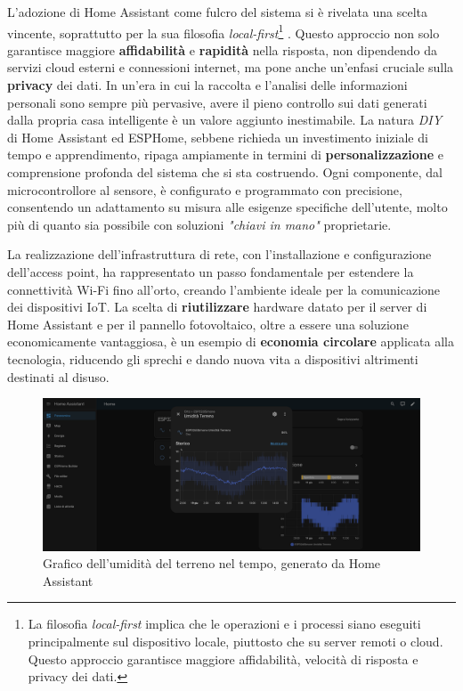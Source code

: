 \documentclass[11pt, a4paper]{article}
\begin{document}
L'adozione di Home Assistant come fulcro del sistema si è rivelata una scelta vincente, 
soprattutto per la sua filosofia 
\textit{local-first}\footnote{La filosofia \textit{local-first} implica che le operazioni e i processi
siano eseguiti principalmente sul dispositivo locale, piuttosto che su server remoti
o cloud. Questo approccio garantisce maggiore affidabilità, velocità di risposta e privacy dei dati.}
. Questo approccio non solo garantisce maggiore 
\textbf{affidabilità} e \textbf{rapidità} nella risposta, non dipendendo da servizi cloud esterni e connessioni 
internet, ma pone anche un'enfasi cruciale sulla \textbf{privacy} dei dati. In un'era in cui la raccolta 
e l'analisi delle informazioni personali sono sempre più pervasive, avere il pieno controllo sui 
dati generati dalla propria casa intelligente è un valore aggiunto inestimabile. La natura \textit{DIY} 
di Home Assistant ed ESPHome, sebbene richieda un investimento iniziale di 
tempo e apprendimento, ripaga ampiamente in termini di \textbf{personalizzazione} e comprensione profonda 
del sistema che si sta costruendo. Ogni componente, dal microcontrollore al sensore, è 
configurato e programmato con precisione, consentendo un adattamento su misura alle esigenze 
specifiche dell'utente, molto più di quanto sia possibile con soluzioni \textit{"chiavi in mano"} proprietarie.

La realizzazione dell'infrastruttura di rete, con l'installazione e configurazione dell'access point, 
ha rappresentato un passo fondamentale per estendere la connettività Wi-Fi fino all'orto, creando 
l'ambiente ideale per la comunicazione dei dispositivi IoT. La scelta di \textbf{riutilizzare} hardware datato 
per il server di Home Assistant e per il pannello fotovoltaico, oltre a essere una soluzione economicamente 
vantaggiosa, è un esempio di \textbf{economia circolare} applicata alla tecnologia, riducendo gli sprechi e dando nuova vita a 
dispositivi altrimenti destinati al disuso.

\begin{figure}[H]
    \centering
    \includegraphics[width=1\textwidth]{media/dashboard-home-assistant-grafico.png}
    \caption{Grafico dell'umidità del terreno nel tempo, generato da Home Assistant}
    \label{fig:grafico-umidita}
\end{figure}
\end{document}
